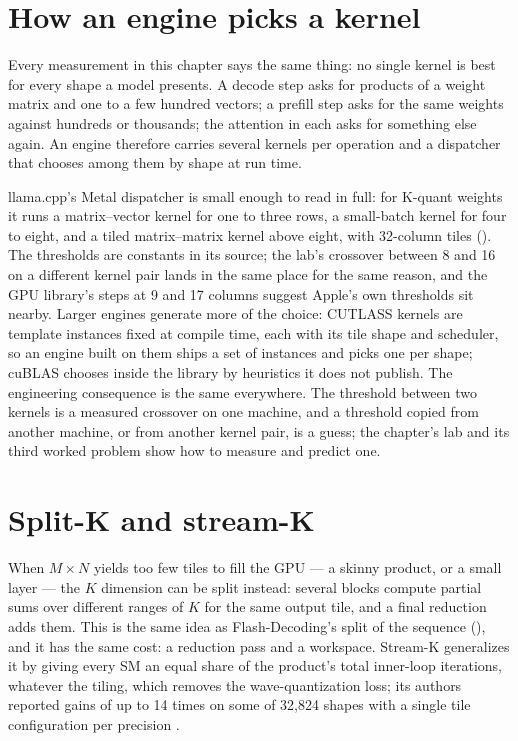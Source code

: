\section{How an engine picks a kernel}

Every measurement in this chapter says the same thing: no single kernel is best
for every shape a model presents. A decode step asks for products of a weight
matrix and one to a few hundred vectors; a prefill step asks for the same weights
against hundreds or thousands; the attention in each asks for something else
again. An engine therefore carries several kernels per operation and a
dispatcher that chooses among them by shape at run time.

llama.cpp's Metal dispatcher is small enough to read in full: for K-quant weights
it runs a matrix--vector kernel for one to three rows, a small-batch kernel for four
to eight, and a tiled matrix--matrix kernel above eight, with 32-column tiles
(). The thresholds are constants in its source; the lab's
crossover between 8 and 16 on a different kernel pair lands in the same place for
the same reason, and the GPU library's steps at 9 and 17 columns suggest Apple's
own thresholds sit nearby. Larger engines generate more of the choice: CUTLASS
kernels are template instances fixed at compile time, each with its tile shape and
scheduler, so an engine built on them ships a set of instances and picks one per
shape; cuBLAS chooses inside the library by heuristics it does not publish. The
engineering consequence is the same everywhere. The threshold between two kernels
is a measured crossover on one machine, and a threshold copied from another
machine, or from another kernel pair, is a guess; the chapter's lab and its third
worked problem show how to measure and predict one.

\section{Split-K and stream-K}

When $M\times N$ yields too few tiles to fill the GPU --- a skinny product, or
a small layer --- the $K$ dimension can be split instead: several blocks compute
partial sums over different ranges of $K$ for the same output tile, and a final
reduction adds them. This is the same idea as Flash-Decoding's split of the
sequence (), and it has the same cost: a reduction pass
and a workspace. Stream-K generalizes it by giving every SM an equal share of
the product's total inner-loop iterations, whatever the tiling, which removes
the wave-quantization loss; its authors reported gains of up to 14 times on some
of 32,824 shapes with a single tile configuration per precision
\cite{osama2023streamk}.


